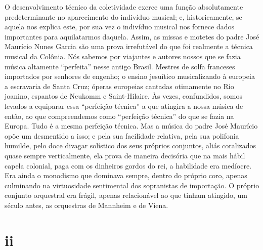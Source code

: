 O desenvolvimento técnico da coletividade exerce uma função
absolutamente predeterminante no aparecimento do indivíduo musical; e,
historicamente, se aquela nos explica este, por sua vez o indivíduo
musical nos fornece dados importantes para aquilatarmos daquela. Assim,
as missas e motetes do padre José Maurício Nunes Garcia são uma prova
irrefutável do que foi realmente a técnica musical da Colônia. Nós
sabemos por viajantes e autores nossos que se fazia música altamente
``perfeita'' nesse antigo Brasil. Mestres de solfa franceses importados
por senhores de engenho; o ensino jesuítico musicalizando à europeia a
escravaria de Santa Cruz; óperas europeias cantadas otimamente no Rio
joanino, espantos de Neukomm e Saint-Hilaire. Às vezes, confundidos,
somos levados a equiparar essa ``perfeição técnica'' a que atingira a
nossa música de então, ao que compreendemos como ``perfeição técnica''
do que se fazia na Europa. Tudo é a mesma perfeição técnica. Mas a
música do padre José Maurício opõe um desmentido a isso; e pela sua
facilidade relativa, pela sua polifonia humilde, pelo doce divagar
solístico dos seus próprios conjuntos, aliás coralizados quase sempre
verticalmente, ela prova de maneira decisória que na mais hábil capela
colonial, paga com os dinheiros gordos do rei, a habilidade era
medíocre. Era ainda o monodismo que dominava sempre, dentro do próprio
coro, apenas culminando na virtuosidade sentimental dos sopranistas de
importação. O próprio conjunto orquestral era frágil, apenas
relacionável ao que tinham atingido, um século antes, as orquestras de
Mannheim e de Viena.

\section*{ii}

